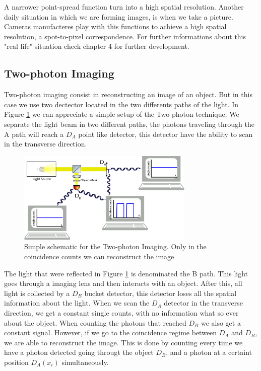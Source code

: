  A narrower point-spread function turn into a high spatial resolution. Another daily situation in which we are forming images, is when we take a picture. Cameras manufacteres play 
with this functions to achieve a high spatial resolution, a spot-to-pixel correspondence.
For further informations about this "real life" situation check\cite{introquantumoptics} chapter 4 for further development.



\subsection{Two-photon Imaging}\label{twoPhotonImaging}

Two-photon imaging consist in reconstructing an image of an object. 
But in this case we use two dectector located in the two differents paths of the light. 
In Figure \ref{fig:twoPhotonSetup} we can appreciate a simple setup of the Two-photon technique.
We separate the light beam in two different paths, the photons traveling through the A path will reach
a $D_A$  point like detector, this detector have the ability to scan in the transverse direction.





\begin{figure}[h]
\centering
\includegraphics[width=0.75\textwidth]{Figures/twoPhotonSetupPC.png}
\caption{Simple schematic for the Two-photon Imaging. Only in the coincidence counts we can reconstruct the image} 
\label{fig:twoPhotonSetup}
\end{figure}

The light that were reflected in Figure \ref{fig:twoPhotonSetup} is denominated the B path.
This light goes through a imaging lens and then interacts with an object. After this, all light is collected
by a $D_B$ bucket detector, this detector loses all the spatial information about the light.
When we scan the $D_A$ detector in the transverse direction, we get a constant single 
counts, with no information what so ever about the object. When counting the photons that reached $D_B$
we also get a constant signal. 
However, if we go to the coincidence regime between $D_A$ and $D_B$, we are able to reconstruct the image.
This is done by counting every time we have a photon detected going througt the object $D_B$, and a photon at a certaint 
position $D_A(x_i)$ simultaneously. 



